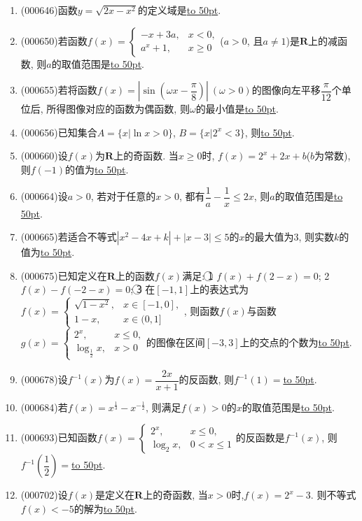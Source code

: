 \documentclass[10pt,a4paper]{article}
\newcommand{\blank}[1]{\underline{\hbox to #1pt{}}}
\begin{document}
\begin{enumerate}[1.]
\item {\tiny (000646)}函数$y=\sqrt{2x-x^2}$的定义域是\blank{50}.
\item {\tiny (000650)}若函数$f(x)=\begin{cases} -x+3a, & x<0,  \\ a^x+1, & x\ge 0 \end{cases}$($a>0$, 且$a\ne 1$)是$\mathbf{R}$上的减函数, 则$a$的取值范围是\blank{50}.
\item {\tiny (000655)}若将函数$f(x)=|\sin(\omega x-\dfrac{\pi}8)| \ (\omega >0)$的图像向左平移$\dfrac{\pi}{12}$个单位后, 所得图像对应的函数为偶函数, 则$\omega$的最小值是\blank{50}.
\item {\tiny (000656)}已知集合$A=\{x|\ln x>0 \}$, $B=\{x|2^x<3\}$, 则\blank{50}.
\item {\tiny (000660)}设$f(x)$为$\mathbf{R}$上的奇函数. 当$x\ge 0$时, $f(x)=2^x+2x+b$($b$为常数), 则$f(-1)$的值为\blank{50}.
\item {\tiny (000664)}设$a>0$, 若对于任意的$x>0$, 都有$\dfrac1a-\dfrac1x\le 2x$, 则$a$的取值范围是\blank{50}.
\item {\tiny (000665)}若适合不等式$|x^2-4x+k|+|x-3|\le 5$的$x$的最大值为$3$, 则实数$k$的值为\blank{50}.
\item {\tiny (000675)}已知定义在$\mathbf{R}$上的函数$f(x)$满足: \textcircled{1} $f(x)+f(2-x)=0$; \textcircled{2} $f(x)-f(-2-x)=0$; \textcircled{3} 在$[-1,1]$上的表达式为$f(x)=\begin{cases} \sqrt{1-x^2}, & x\in [-1,0], \\ 1-x, & x\in (0,1] \end{cases}$, 则函数$f(x)$与函数$g(x)=\begin{cases} 2^x, & x\le 0, \\ \log_{\frac12} x,& x>0 \end{cases}$的图像在区间$[-3,3]$上的交点的个数为\blank{50}.
\item {\tiny (000678)}设$f^{-1}(x)$为$f(x)=\dfrac{2x}{x+1}$的反函数, 则$f^{-1}(1)=$\blank{50}.
\item {\tiny (000684)}若$f(x)={x^{\frac13}}-{x^{-\frac12}}$, 则满足$f(x)>0$的$x$的取值范围是\blank{50}.
\item {\tiny (000693)}已知函数$f(x)=\begin{cases}2^x, & x\le 0, \\ \log_2 x, & 0<x\le 1\end{cases}$的反函数是$f^{-1}(x)$, 则$f^{-1}(\dfrac12)=$\blank{50}.
\item {\tiny (000702)}设$f(x)$是定义在$\mathbf{R}$上的奇函数, 当$x>0$时,$f(x)=2^x-3$. 则不等式$f(x)<-5$的解为\blank{50}.

\end{enumerate}
\end{document}
